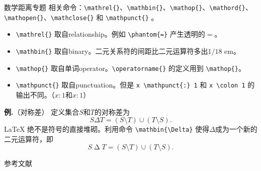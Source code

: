 \documentclass[mathserif]{beamer}
\newcommand{\codegreen}[1]{\textcolor{codegreen}{#1}}
\newenvironment{instance}{\zihao{-5}\textbf{\songti \codegreen{例.}}}{\hfill\par}
\begin{document}
\begin{frame}[fragile]{数学距离专题}
相关命令：\lstinline'\mathrel{}'、\lstinline'\mathbin{}'、\lstinline'\mathop{}'、\lstinline'\mathord{}'、\lstinline'\mathopen{}'、\lstinline'\mathclose{}' 和 \lstinline'\mathpunct{}' 。
\begin{itemize}

\item \lstinline'\mathrel{}' 取自relationship。例如 \lstinline'\phantom{=}' 产生透明的$=$。

\item \lstinline'\mathbin{}' 取自binary。二元关系符的间距比二元运算符多出$1/18$ em。

\item \lstinline'\mathop{}' 取自单词operator。\lstinline'\operatorname{}' 的定义用到 \lstinline'\mathop{}'。



\item \lstinline'\mathpunct{}' 取自punctuation。但是 \lstinline'x \mathpunct{:} 1' 和 \lstinline'x \colon 1' 的输出不同。（$x \mathpunct{:} 1$和$x \colon 1$）

\end{itemize}
\begin{instance}（对称差）
	定义集合$S$和$T$的对称差为
\begin{equation*}
	S \Delta T = \left( S \setminus T \right) \cup \left( T \setminus S \right).
\end{equation*}
\LaTeX{} 绝不是符号的直接堆砌。利用命令 \lstinline'\mathbin{\Delta}' 使得$\Delta$成为一个新的二元运算符，即
\begin{equation*}
	S \mathbin{\Delta} T = \left( S \setminus T \right) \cup \left( T \setminus S \right).
\end{equation*}
\end{instance}
\end{frame}

\begin{frame}{参考文献}

\end{frame}
\end{document}
